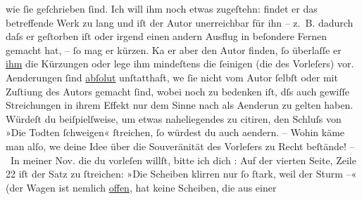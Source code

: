 \begin{ledgroupsized}[t]{13cm}
               wie ſie geſchrieben ſind. Ich will ihm noch etwas zugeſtehn: findet er das
               betreffende Werk zu lang und iſt der Autor unerreichbar für ihn – z. B. dadurch daſs
               er geſtorben iſt oder irgend einen andern Ausflug in {\pb}beſondere Fernen
               gemacht hat, – ſo mag er kürzen. Ka{\geminationn} er aber den Autor
               finden, ſo überlaſſe er \uline{ihm} die Kürzungen oder lege
               ihm mindeſtens die ſeinigen (die des Vorleſers) vor. Aenderungen ſind \uline{abſolut} unſtatthaft, we{\geminationn}{ }ſie nicht vom Autor ſelbſt oder mit Zuſti{\geminationm}ung des Autors gemacht ſind, wobei noch zu bedenken
               iſt, dſs auch gewiſſe Streichungen in ihrem Effekt nur dem {\pb}Sinne nach als
                  Aenderun zu gelten haben. Würdeſt du beiſpielſweise, um etwas naheliegendes zu
               citiren, den Schluſs von »Die Todten ſchweigen«
               ſtreichen, ſo würdest du auch aendern. – Wohin käme man \introOben{}alſo\introOben{}, we{\geminationn} deine Idee über die Souveränität des
               Vorleſers zu Recht beſtände!\pend
           \pstart
           – In meiner Nov. die du vorleſen willſt, bitte ich dich \label{K_L00740_1v}\label{K_L00740_1h}: Auf
               der vierten Seite, Zeile 22 iſt der Satz zu ſtreichen: »Die Scheiben klirren nur ſo
               ſtark, weil der Sturm –« (der Wagen ist nemlich \uline{offen}, hat keine {\pb}Scheiben, die aus einer \label{K_L00740_2v}
\end{ledgroupsized}
